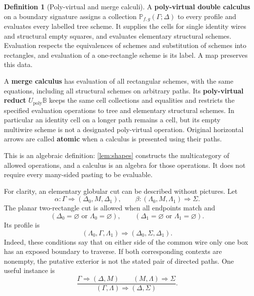 \documentclass[11pt,reqno]{amsart}
\theoremstyle{plain}
\theoremstyle{definition}
\newtheorem{definition}[theorem]{Definition}
\theoremstyle{remark}
\numberwithin{equation}{section}
\newcommand{\Pcal}{\mathbb P}
\newcommand{\Bcal}{\mathbb B}
\newcommand{\Up}{U_{\mathrm{poly}}}
\newcommand{\cell}{\mathrel{\Longrightarrow}}
\begin{document}
\begin{definition}[Poly-virtual and merge calculi]\label{def:poly}
A \textbf{poly-virtual double calculus} on a boundary signature assigns a
collection $\Pcal_{f,g}(\Gamma;\Delta)$ to every profile and evaluates every
labelled tree scheme. It supplies the cells for single identity wires and
structural empty squares, and evaluates elementary structural schemes.
Evaluation respects the equivalences of
schemes and substitution of schemes into rectangles, and evaluation of a
one-rectangle scheme is its label. A map preserves this data.

A \textbf{merge calculus} has evaluation of all rectangular schemes, with
the same equations, including all structural schemes on arbitrary paths.
Its \textbf{poly-virtual reduct} $\Up\Bcal$ keeps the
same cell collections and equalities and restricts the specified evaluation
operations to tree and elementary structural schemes. In particular an
identity cell on a longer path remains a cell, but its empty multiwire
scheme is not a designated poly-virtual operation. Original horizontal arrows are
called \textbf{atomic} when a calculus is presented using their paths.
\end{definition}

This is an algebraic definition: \cref{lem:shapes} constructs the
multicategory of allowed operations, and a calculus is an algebra for those
operations. It does not require every many-sided pasting to be evaluable.

For clarity, an elementary globular cut can be described without pictures.
Let
\[
 \alpha:\Gamma\cell(\Delta_0,M,\Delta_1),\qquad
 \beta:(\Lambda_0,M,\Lambda_1)\cell\Sigma.
\]
The planar two-rectangle cut is allowed when all endpoints match and
\begin{equation}\label{eq:cutplacement}
 (\Delta_0=\varnothing\text{ or }\Lambda_0=\varnothing),\qquad
 (\Delta_1=\varnothing\text{ or }\Lambda_1=\varnothing).
\end{equation}
Its profile is
\[
 (\Lambda_0,\Gamma,\Lambda_1)\cell
 (\Delta_0,\Sigma,\Delta_1).
\]
Indeed, these conditions say that on either side of the common wire only
one box has an exposed boundary to traverse. If both corresponding
contexts are nonempty, the putative exterior is not the stated pair of
directed paths. One useful instance is
\begin{equation}\label{eq:cornercut}
 \frac{\Gamma\cell(\Delta,M)\qquad (M,\Lambda)\cell\Sigma}
 { (\Gamma,\Lambda)\cell(\Delta,\Sigma)}.
\end{equation}
\end{document}

